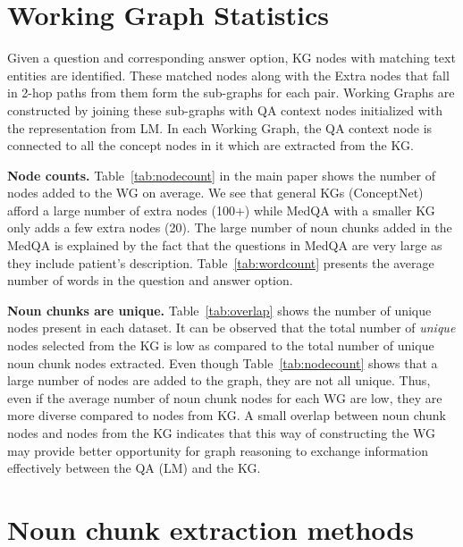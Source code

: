 \documentclass[11pt]{article}
\renewcommand{\paragraph}[1]{\vspace{1mm}\noindent\textbf{#1}}
\begin{document}
\section{Working Graph Statistics}
\label{app:graphstats}
Given a question and corresponding answer option, KG nodes with matching text entities are identified.
These matched nodes along with the Extra nodes that fall in 2-hop paths from them form the sub-graphs for each  pair.
Working Graphs are constructed by joining these sub-graphs with QA context nodes initialized with the representation from LM.
In each Working Graph, the QA context node is connected to all the concept nodes in it which are extracted from the KG. 

\paragraph{Node counts.}
Table~\ref{tab:nodecount} in the main paper shows the number of nodes added to the WG on average.
We see that general KGs (ConceptNet) afford a large number of extra nodes (100+) while MedQA with a smaller KG only adds a few extra nodes (20).
The large number of noun chunks added in the MedQA is explained by the fact that the questions in MedQA are very large as they include patient's description.
Table~\ref{tab:wordcount} presents the average number of words in the question and answer option.

\paragraph{Noun chunks are unique.}
Table~\ref{tab:overlap} shows the number of unique nodes present in each dataset.
It can be observed that the total number of \emph{unique} nodes selected from the KG is low as compared to the total number of unique noun chunk nodes extracted.
Even though Table~\ref{tab:nodecount} shows that a large number of nodes are added to the graph, they are not all unique.
Thus, even if the average number of noun chunk nodes for each WG are low, they are more diverse compared to nodes from KG.
A small overlap between noun chunk nodes and nodes from the KG indicates that this way of constructing the WG may provide better opportunity for graph reasoning to exchange information effectively between the QA (LM) and the KG.



\section{Noun chunk extraction methods}
\label{app:spacy_nltk}
\end{document}
